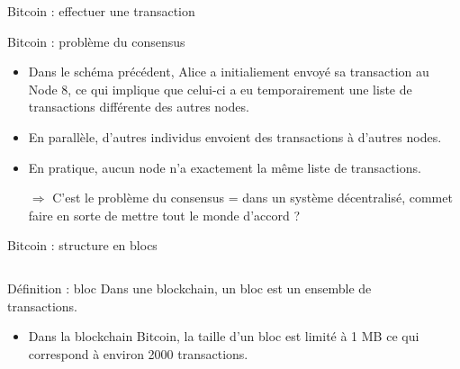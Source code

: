 \begin{frame}{Bitcoin : effectuer une transaction}
  
\end{frame}

\begin{frame}{Bitcoin : problème du consensus}
  \begin{itemize}
    \item Dans le schéma précédent, Alice a initialiement envoyé sa transaction au Node 8, ce qui implique que celui-ci a eu temporairement une liste de transactions différente des autres nodes.
    \item En parallèle, d'autres individus envoient des transactions à d'autres nodes.
    \item En pratique, aucun node n'a exactement la même liste de transactions.
    \item[$\Rightarrow$] C'est le problème du consensus = dans un système décentralisé, commet faire en sorte de mettre tout le monde d'accord ?
  \end{itemize}
\end{frame}

\begin{frame}[fragile]{Bitcoin : structure en blocs}
  \begin{columns}
    \begin{column}{0.5\textwidth}
      \begin{block}{Définition : bloc}
        Dans une blockchain, un bloc est un ensemble de transactions.
      \end{block}

      \begin{itemize}
        \item Dans la blockchain Bitcoin, la taille d'un bloc est limité à 1 MB ce qui correspond à environ 2000 transactions.
      \end{itemize}
    \end{column}

    \begin{column}{0.5\textwidth}
      
    \end{column}
  \end{columns}
\end{frame}

